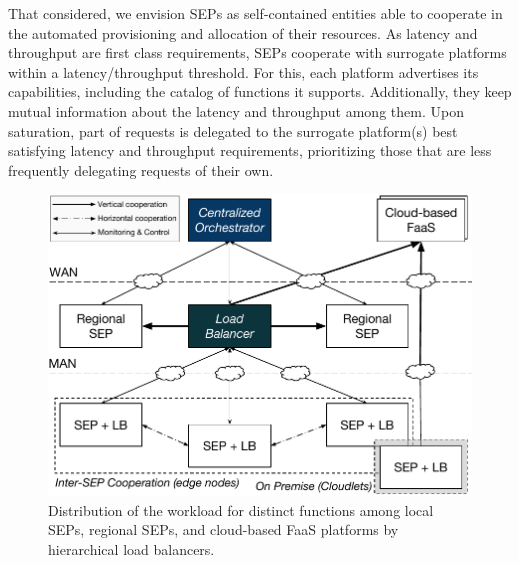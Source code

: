 That considered,
we envision SEPs as self-contained entities able to cooperate in the automated provisioning and allocation of their resources. 
As latency and throughput are first class requirements,
SEPs cooperate
with surrogate platforms within a latency/throughput threshold. For this, each platform advertises its capabilities, including the catalog of functions it supports. Additionally, they keep mutual information about the latency and throughput among them. Upon saturation, part of requests is delegated to the surrogate platform(s) best satisfying latency and throughput requirements, prioritizing those that are less frequently delegating requests of their own.









\begin{figure}[thb]
	\centering
	\includegraphics[width=0.95\linewidth]{Figs/Workload_Distribution}
	\caption{Distribution of the workload for distinct functions among local SEPs, regional SEPs, and cloud-based FaaS platforms by hierarchical load balancers.}
	\label{fig:Workload_Distribution}
\end{figure}

